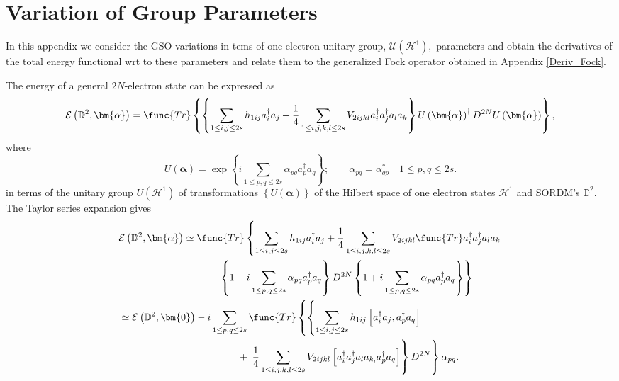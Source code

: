 \documentclass{preprint}
\begin{document}
\section{Variation of Group Parameters\label{VarGroupPar}}

In this appendix we consider the GSO variations in tems of one electron
unitary group, $\mathcal{U}\left( \mathcal{H}^{1}\right) ,$ parameters and
obtain the derivatives of the total energy functional wrt to these
parameters and relate them to the generalized Fock operator obtained in
Appendix \ref{Deriv_Fock}.

The energy of a general $2N$-electron state can be expressed as
\begin{equation}
\mathcal{E}\left( \mathbb{D}^{2},\bm{\alpha}\right) =\func{Tr}\left\{
\left\{ \sum_{1\leq i,j\leq 2s}h_{1ij}a_{i}^{\dagger }a_{j}+\frac{1}{4}%
\sum_{1\leq i,j,k,l\leq 2s}V_{2ijkl}a_{i}^{\dagger }a_{j}^{\dagger
}a_{l}a_{k}\right\} U\left( \bm{\alpha}\right) ^{\dagger }D^{2N}U\left( %
\bm{\alpha}\right) \right\} ,
\end{equation}%
where
\begin{equation}
U\left( \bm{\alpha}\right) =\exp \left\{ i\sum_{1\leq p,q\leq 2s}\alpha
_{pq}a_{p}^{\dagger }a_{q}\right\} ;\qquad \alpha _{pq}=\alpha _{qp}^{\ast
}\quad 1\leq p,q\leq 2s.
\end{equation}%
in terms of the unitary group $U\left( \mathcal{H}^{1}\right) $ of
transformations $\left\{ U\left( \bm{\alpha}\right) \right\} $ of the
Hilbert space of one electron states $\mathcal{H}^{1}$ and SORDM's $\mathbb{D%
}^{2}$. The Taylor series expansion gives
\begin{align}
& \mathcal{E}\left( \mathbb{D}^{2},\bm{\alpha}\right) \simeq \func{Tr}%
\left\{ \sum_{1\leq i,j\leq 2s}h_{1ij}a_{i}^{\dagger }a_{j}+\frac{1}{4}%
\sum_{1\leq i,j,k,l\leq 2s}V_{2ijkl}\func{Tr}a_{i}^{\dagger }a_{j}^{\dagger
}a_{l}a_{k}\right.  \notag \\
& \qquad \qquad \qquad \qquad \qquad \left. \left\{ 1-i\sum_{1\leq p,q\leq
2s}\alpha _{pq}a_{p}^{\dagger }a_{q}\right\} D^{2N}\left\{ 1+i\sum_{1\leq
p,q\leq 2s}\alpha _{pq}a_{p}^{\dagger }a_{q}\right\} \right\}  \notag \\
& \simeq \mathcal{E}\left( \mathbb{D}^{2},\bm{0}\right) -i\sum_{1\leq
p,q\leq 2s}\func{Tr}\left\{ \left\{ \sum_{1\leq i,j\leq 2s}h_{1ij}\left[
a_{i}^{\dagger }a_{j},a_{p}^{\dagger }a_{q}\right] \right. \right.  \notag \\
& \qquad \qquad \qquad \qquad \qquad \qquad +\left. \left. \frac{1}{4}%
\sum_{1\leq i,j,k,l\leq 2s}V_{2ijkl}\left[ a_{i}^{\dagger }a_{j}^{\dagger
}a_{l}a_{k,}a_{p}^{\dagger }a_{q}\right] \right\} D^{2N}\right\} \alpha
_{pq}.
\end{align}%
\end{document}
